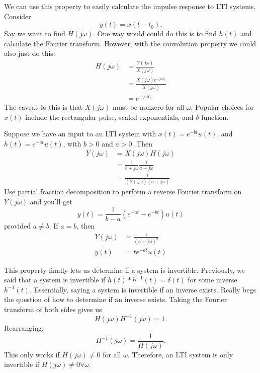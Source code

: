 We can use this property to easily calculate the impulse response to  
LTI systems. Consider
\begin{equation}
    y(t) = x(t - t_0).
\end{equation}
Say we want to find $H(j\omega)$. One way would could do this is to find 
$h(t)$ and calculate the Fourier transform. However, with the convolution 
property we could also just do this:
\begin{align}
    H(j\omega) &= \frac{Y(j\omega)}{X(j\omega)} \\
    &= \frac{X(j\omega)e^{-j\omega t_0}}{X(j\omega)} \\
    &= e^{-j\omega t_0}
\end{align}
The caveat to this is that $X(j\omega)$ must be nonzero for all 
$\omega$. Popular choices for $x(t)$ include the rectangular pulse, 
scaled exponentials, and $\delta$ function. 

Suppose we have an input to an LTI system with $x(t) = e^{-bt}u(t)$, 
and $h(t) = e^{-at}u(t)$, with $b > 0$ and $a > 0$. Then 
\begin{align}
    Y(j\omega) &= X(j\omega)H(j\omega) \\
    &= \frac{1}{b + j\omega} \frac{1}{a + j\omega} \\
    &= \frac{1}{(b + j\omega)(a + j\omega)} 
\end{align}
Use partial fraction decomposition to perform a reverse Fourier 
transform on $Y(j\omega)$ and you'll get 
\begin{equation}
    y(t) = \frac{1}{b - a} \left( e^{-at} - e^{-bt}\right)u(t)
\end{equation}
provided $a \neq b$. If $a = b$, then 
\begin{align}
    Y(j\omega) &= \frac{1}{(a + j\omega)^2} \\
    y(t) &= te^{-at}u(t)
\end{align}

This property finally lets us determine if a system is invertible. 
Previously, we said that a system is invertible if $h(t) * h^{-1}(t) = \delta(t)$
for some inverse $h^{-1}(t)$. Essentially, saying a system is invertible 
if an inverse exists. Really begs the question of how to determine if 
an inverse exists. Taking the Fourier transform of both sides gives us
\begin{equation}
    H(j\omega)H^{-1}(j\omega) = 1.
\end{equation}
Rearranging, 
\begin{equation}
    H^{-1}(j\omega) = \frac{1}{H(j\omega)}.
\end{equation}
This only works if $H(j\omega) \neq 0$ for all $\omega$. Therefore, 
an LTI system is only invertible if $H(j\omega) \neq 0 \forall \omega$. 